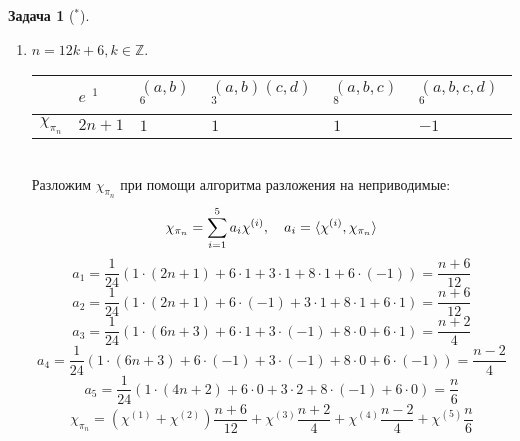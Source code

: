 \documentclass[12pt]{article}
\theoremstyle{definition}
\newtheorem{zad}{Задача}[section]
\begin{document}
\begin{zad}[$^*$]
\begin{itemize}
\begin{enumerate}
    \item $n=12k+6,k\in\mathbb{Z}$.
    \begin{table}[h!]
    \centering
    \begin{tabular}{|l|l|l|l|l|l|}
    \hline
     & $e$ $^1$ & $(a,b)$ $^6$ & $(a,b)(c,d)$ $^3$ & $(a,b,c)$ $^8$ & $(a,b,c,d)$ $^6$ \\ \hline
    $\chi_{\pi_n}$ & $2n+1$ & $1$ & $1$ & $1$ & $-1$ \\ \hline
    \end{tabular}
    \end{table}\\
    Разложим $\chi_{\pi_n}$ при помощи алгоритма разложения на неприводимые:
    \begin{equation}
        \chi_{\pi_n}=\sum\limits_{i=1}^5 a_i\chi^{(i)},\quad a_i=\braket{\chi^{(i)},\chi_{\pi_n}}
    \end{equation}
    \begin{equation}
        a_1=\frac{1}{24}(1\cdot(2n+1)+6\cdot1+3\cdot1+8\cdot1+6\cdot(-1))=\frac{n+6}{12}
    \end{equation}
    \begin{equation}
        a_2=\frac{1}{24}(1\cdot(2n+1)+6\cdot(-1)+3\cdot1+8\cdot1+6\cdot1)=\frac{n+6}{12}
    \end{equation}
    \begin{equation}
        a_3=\frac{1}{24}(1\cdot(6n+3)+6\cdot1+3\cdot(-1)+8\cdot0+6\cdot1)=\frac{n+2}{4}
    \end{equation}
    \begin{equation}
        a_4=\frac{1}{24}(1\cdot(6n+3)+6\cdot(-1)+3\cdot(-1)+8\cdot0+6\cdot(-1))=\frac{n-2}{4}
    \end{equation}
    \begin{equation}
        a_5=\frac{1}{24}(1\cdot(4n+2)+6\cdot0+3\cdot2+8\cdot(-1)+6\cdot0)=\frac{n}{6}
    \end{equation}
    \begin{equation}
        \boxed{\chi_{\pi_n}=(\chi^{(1)}+\chi^{(2)})\frac{n+6}{12}+\chi^{(3)}\frac{n+2}{4}+\chi^{(4)}\frac{n-2}{4}+\chi^{(5)}\frac{n}{6}}
    \end{equation}
    

\end{enumerate}
\end{itemize}
\end{zad}
\end{document}
